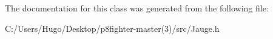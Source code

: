 The documentation for this class was generated from the following file\+:\begin{DoxyCompactItemize}
\item 
C\+:/\+Users/\+Hugo/\+Desktop/p8fighter-\/master(3)/src/Jauge.\+h\end{DoxyCompactItemize}
